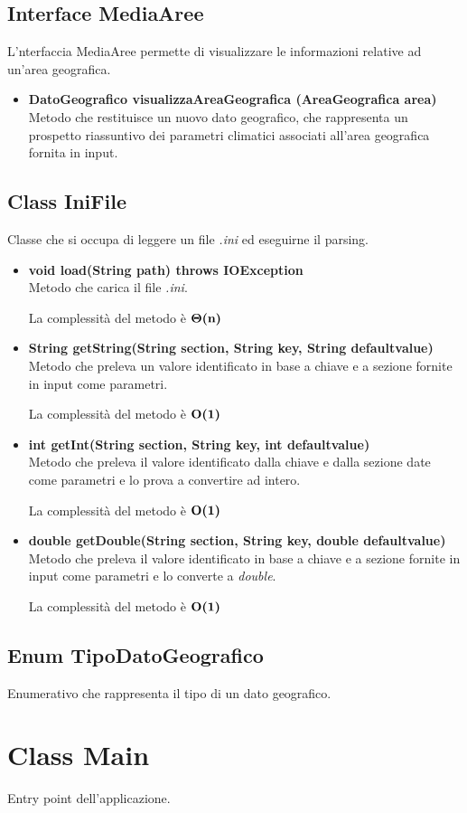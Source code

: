 \documentclass[a4paper, 12pt]{scrreprt}
\begin{document}
			\subsection{Interface MediaAree}
			L'nterfaccia MediaAree permette di visualizzare le informazioni relative ad un'area geografica.
			\begin{itemize}
				\item\textbf {DatoGeografico visualizzaAreaGeografica (AreaGeografica area)}
				\\Metodo che restituisce un nuovo dato geografico, che rappresenta un prospetto riassuntivo dei parametri climatici associati all'area geografica fornita in input.
			\end{itemize}
			\pagebreak
			\subsection{Class IniFile}
			Classe che si occupa di leggere un file \textsl{.ini} ed eseguirne il parsing.
			\begin{itemize}
				\item \textbf{void load(String path) throws IOException}
				\\Metodo che carica il file \textsl{.ini}.

				La complessit\`a del metodo \`e $\mathbf{\Theta}\textbf{(n)}$

				\item \textbf{String getString(String section, String key, String defaultvalue)}
				\\Metodo che preleva un valore identificato in base a chiave e a sezione fornite in input come parametri.

				La complessit\`a del metodo \`e $\mathbf{O}\textbf{(1)}$

				\item \textbf{int getInt(String section, String key, int defaultvalue)}
				\\Metodo che preleva il valore identificato dalla chiave e dalla sezione date come parametri e lo prova a convertire ad intero.

				La complessit\`a del metodo \`e $\mathbf{O}\textbf{(1)}$

				\item \textbf{double getDouble(String section, String key, double defaultvalue)}
				\\Metodo che preleva il valore identificato in base a chiave e a sezione fornite in input come parametri e lo converte a \textsl{double}.

				La complessit\`a del metodo \`e $\mathbf{O}\textbf{(1)}$


			\end{itemize}
			\subsection{Enum TipoDatoGeografico}
			Enumerativo che rappresenta il tipo di un dato geografico.


		\section{Class Main}
		Entry point dell'applicazione.

	\nocite{IuriTex}
	
	
\end{document}
